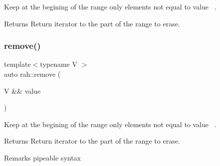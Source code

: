 Keep at the begining of the range only elements not equal to value~\newline
. 

\begin{DoxyReturn}{Returns}
Return iterator to the part of the range to erase.
\end{DoxyReturn}

\begin{DoxyCodeInclude}{0}
\end{DoxyCodeInclude}
\mbox{\label{namespacerah_a8f9d8b6cbb2431bddd42cc4e2378f13f}} 
\subsubsection{\texorpdfstring{remove()}{remove()}\hspace{0.1cm}{\footnotesize\ttfamily [2/2]}}
{\footnotesize\ttfamily template$<$typename V $>$ \\
auto rah\+::remove (\begin{DoxyParamCaption}\item[{V \&\&}]{value }\end{DoxyParamCaption})}



Keep at the begining of the range only elements not equal to value~\newline
. 

\begin{DoxyReturn}{Returns}
Return iterator to the part of the range to erase. 
\end{DoxyReturn}
\begin{DoxyRemark}{Remarks}
pipeable syntax
\end{DoxyRemark}

